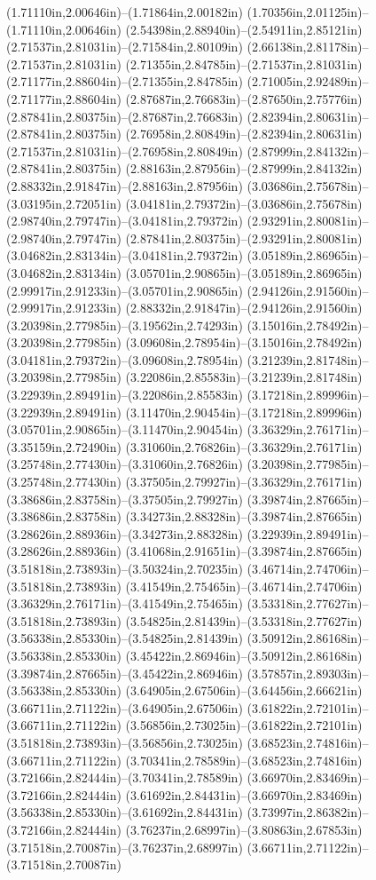 (1.71110in,2.00646in)--(1.71864in,2.00182in) (1.70356in,2.01125in)--(1.71110in,2.00646in) (2.54398in,2.88940in)--(2.54911in,2.85121in) (2.71537in,2.81031in)--(2.71584in,2.80109in) (2.66138in,2.81178in)--(2.71537in,2.81031in) (2.71355in,2.84785in)--(2.71537in,2.81031in) (2.71177in,2.88604in)--(2.71355in,2.84785in) (2.71005in,2.92489in)--(2.71177in,2.88604in) (2.87687in,2.76683in)--(2.87650in,2.75776in) (2.87841in,2.80375in)--(2.87687in,2.76683in) (2.82394in,2.80631in)--(2.87841in,2.80375in) (2.76958in,2.80849in)--(2.82394in,2.80631in) (2.71537in,2.81031in)--(2.76958in,2.80849in) (2.87999in,2.84132in)--(2.87841in,2.80375in) (2.88163in,2.87956in)--(2.87999in,2.84132in) (2.88332in,2.91847in)--(2.88163in,2.87956in) (3.03686in,2.75678in)--(3.03195in,2.72051in) (3.04181in,2.79372in)--(3.03686in,2.75678in) (2.98740in,2.79747in)--(3.04181in,2.79372in) (2.93291in,2.80081in)--(2.98740in,2.79747in) (2.87841in,2.80375in)--(2.93291in,2.80081in) (3.04682in,2.83134in)--(3.04181in,2.79372in) (3.05189in,2.86965in)--(3.04682in,2.83134in) (3.05701in,2.90865in)--(3.05189in,2.86965in) (2.99917in,2.91233in)--(3.05701in,2.90865in) (2.94126in,2.91560in)--(2.99917in,2.91233in) (2.88332in,2.91847in)--(2.94126in,2.91560in) (3.20398in,2.77985in)--(3.19562in,2.74293in) (3.15016in,2.78492in)--(3.20398in,2.77985in) (3.09608in,2.78954in)--(3.15016in,2.78492in) (3.04181in,2.79372in)--(3.09608in,2.78954in) (3.21239in,2.81748in)--(3.20398in,2.77985in) (3.22086in,2.85583in)--(3.21239in,2.81748in) (3.22939in,2.89491in)--(3.22086in,2.85583in) (3.17218in,2.89996in)--(3.22939in,2.89491in) (3.11470in,2.90454in)--(3.17218in,2.89996in) (3.05701in,2.90865in)--(3.11470in,2.90454in) (3.36329in,2.76171in)--(3.35159in,2.72490in) (3.31060in,2.76826in)--(3.36329in,2.76171in) (3.25748in,2.77430in)--(3.31060in,2.76826in) (3.20398in,2.77985in)--(3.25748in,2.77430in) (3.37505in,2.79927in)--(3.36329in,2.76171in) (3.38686in,2.83758in)--(3.37505in,2.79927in) (3.39874in,2.87665in)--(3.38686in,2.83758in) (3.34273in,2.88328in)--(3.39874in,2.87665in) (3.28626in,2.88936in)--(3.34273in,2.88328in) (3.22939in,2.89491in)--(3.28626in,2.88936in) (3.41068in,2.91651in)--(3.39874in,2.87665in) (3.51818in,2.73893in)--(3.50324in,2.70235in) (3.46714in,2.74706in)--(3.51818in,2.73893in) (3.41549in,2.75465in)--(3.46714in,2.74706in) (3.36329in,2.76171in)--(3.41549in,2.75465in) (3.53318in,2.77627in)--(3.51818in,2.73893in) (3.54825in,2.81439in)--(3.53318in,2.77627in) (3.56338in,2.85330in)--(3.54825in,2.81439in) (3.50912in,2.86168in)--(3.56338in,2.85330in) (3.45422in,2.86946in)--(3.50912in,2.86168in) (3.39874in,2.87665in)--(3.45422in,2.86946in) (3.57857in,2.89303in)--(3.56338in,2.85330in) (3.64905in,2.67506in)--(3.64456in,2.66621in) (3.66711in,2.71122in)--(3.64905in,2.67506in) (3.61822in,2.72101in)--(3.66711in,2.71122in) (3.56856in,2.73025in)--(3.61822in,2.72101in) (3.51818in,2.73893in)--(3.56856in,2.73025in) (3.68523in,2.74816in)--(3.66711in,2.71122in) (3.70341in,2.78589in)--(3.68523in,2.74816in) (3.72166in,2.82444in)--(3.70341in,2.78589in) (3.66970in,2.83469in)--(3.72166in,2.82444in) (3.61692in,2.84431in)--(3.66970in,2.83469in) (3.56338in,2.85330in)--(3.61692in,2.84431in) (3.73997in,2.86382in)--(3.72166in,2.82444in) (3.76237in,2.68997in)--(3.80863in,2.67853in) (3.71518in,2.70087in)--(3.76237in,2.68997in) (3.66711in,2.71122in)--(3.71518in,2.70087in) 